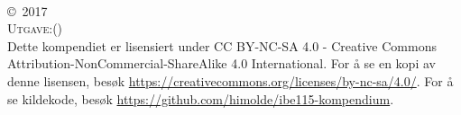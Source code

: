 
\begingroup
\thispagestyle{empty}
\vfill
\endgroup


\newpage
~\vfill
\thispagestyle{empty}

\noindent \copyright\ 2017 \myauthorname\\

\noindent \textsc{Utgave:\gitRels (\mydate)}\\


\noindent Dette kompendiet er lisensiert under CC BY-NC-SA 4.0 - Creative Commons Attribution-NonCommercial-ShareAlike 4.0 International. For å se en kopi av denne lisensen, besøk \url{https://creativecommons.org/licenses/by-nc-sa/4.0/}. For å se kildekode, besøk \url{https://github.com/himolde/ibe115-kompendium}.\\ %

